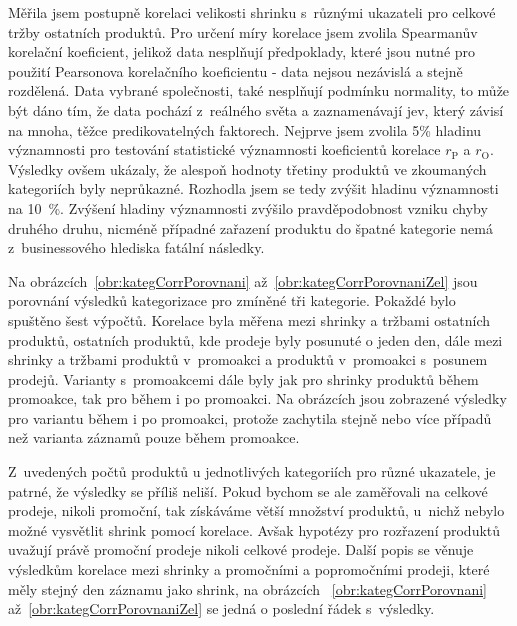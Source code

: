 Měřila jsem postupně korelaci velikosti shrinku s~různými ukazateli pro celkové tržby ostatních produktů. Pro určení míry korelace jsem zvolila Spearmanův korelační koeficient, jelikož data nesplňují předpoklady, které jsou nutné pro použití Pearsonova korelačního koeficientu - data nejsou nezávislá a stejně rozdělená. Data vybrané společnosti, také nesplňují podmínku normality, to může být dáno tím, že data pochází z~reálného světa a zaznamenávají jev, který závisí na mnoha, těžce predikovatelných faktorech. Nejprve jsem zvolila 5\% hladinu významnosti pro testování statistické významnosti koeficientů korelace $r_\mathrm{P}$ a $r_\mathrm{O}$. Výsledky ovšem ukázaly, že alespoň hodnoty třetiny produktů ve zkoumaných kategoriích  byly neprůkazné. Rozhodla jsem se tedy zvýšit hladinu významnosti na 10~\%. Zvýšení hladiny významnosti zvýšilo pravděpodobnost vzniku chyby druhého druhu, nicméně případné zařazení produktu do špatné kategorie nemá z~businessového hlediska fatální následky.

Na obrázcích~\ref*{obr:kategCorrPorovnani} až~\ref*{obr:kategCorrPorovnaniZel} jsou porovnání výsledků kategorizace pro zmíněné tři kategorie. Pokaždé bylo spuštěno šest výpočtů. Korelace byla měřena mezi shrinky a tržbami ostatních produktů, ostatních produktů, kde prodeje byly posunuté o jeden den, dále mezi shrinky a tržbami produktů v~promoakci a produktů v~promoakci s~posunem prodejů. Varianty s~promoakcemi dále byly jak pro shrinky produktů během promoakce, tak pro během i po promoakci. Na obrázcích jsou zobrazené výsledky pro variantu během i po promoakci, protože zachytila stejně nebo více případů než varianta záznamů pouze během promoakce. 

Z~uvedených počtů produktů u jednotlivých kategoriích pro různé ukazatele, je patrné, že výsledky se příliš neliší. Pokud bychom se ale zaměřovali na celkové prodeje, nikoli promoční, tak získáváme větší množství produktů, u~nichž nebylo možné vysvětlit shrink pomocí korelace. Avšak hypotézy pro rozřazení produktů uvažují právě promoční prodeje nikoli celkové prodeje. Další popis se věnuje výsledkům korelace mezi shrinky a promočními a popromočními prodeji, které měly stejný den záznamu jako shrink, na obrázcích ~\ref*{obr:kategCorrPorovnani} až~\ref*{obr:kategCorrPorovnaniZel} se jedná o poslední řádek s~výsledky.

